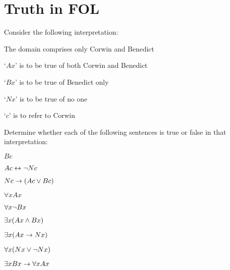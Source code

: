 
\setcounter{chapter}{20}
\chapter{Truth in FOL}\setcounter{ProbPart}{0}
\problempart
\label{pr.TorF1}
Consider the following interpretation:
	\begin{ebullet}
		\item The domain comprises only Corwin and Benedict
		\item `$Ax$' is to be true of both Corwin and Benedict
		\item `$Bx$' is to be true of Benedict only
		\item `$Nx$' is to be true of no one
		\item `$c$' is to refer to Corwin
	\end{ebullet}
Determine whether each of the following sentences is true or false in that interpretation:
\begin{earg}
\item $Bc$ \hfill {}
\item $Ac \leftrightarrow \neg Nc$ \hfill {}
\item $Nc \rightarrow (Ac \vee Bc)$ \hfill {}
\item $\forall x Ax$ \hfill {}
\item $\forall x \neg Bx$ \hfill {}
\item $\exists x(Ax \wedge Bx)$ \hfill {}
\item $\exists x(Ax \rightarrow Nx)$ \hfill {}
\item $\forall x(Nx \vee \neg Nx)$ \hfill {}
\item $\exists x Bx \rightarrow \forall x Ax$ \hfill {}
\end{earg}

